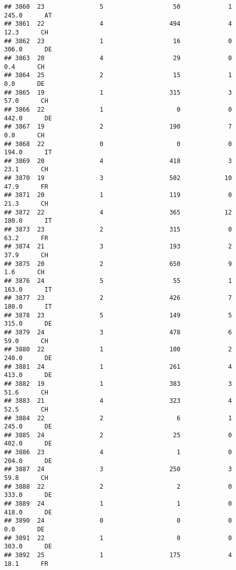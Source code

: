 \documentclass[
]{article}
\begin{document}
\begin{verbatim}
## 3860  23               5                   50             1    245.0      AT
## 3861  22               4                  494             4     12.3      CH
## 3862  23               1                   16             0    306.0      DE
## 3863  20               4                   29             0      0.4      CH
## 3864  25               2                   15             1      0.0      DE
## 3865  19               1                  315             3     57.0      CH
## 3866  22               1                    0             0    442.0      DE
## 3867  19               2                  190             7      0.0      CH
## 3868  22               0                    0             0    194.0      IT
## 3869  20               4                  418             3     23.1      CH
## 3870  19               3                  502            10     47.9      FR
## 3871  20               1                  119             0     21.3      CH
## 3872  22               4                  365            12    180.0      IT
## 3873  23               2                  315             0     63.2      FR
## 3874  21               3                  193             2     37.9      CH
## 3875  20               2                  650             9      1.6      CH
## 3876  24               5                   55             1    163.0      IT
## 3877  23               2                  426             7    180.0      IT
## 3878  23               5                  149             5    315.0      DE
## 3879  24               3                  478             6     59.0      CH
## 3880  22               1                  100             2    240.0      DE
## 3881  24               1                  261             4    413.0      DE
## 3882  19               1                  383             3     51.6      CH
## 3883  21               4                  323             4     52.5      CH
## 3884  22               2                    6             1    245.0      DE
## 3885  24               2                   25             0    402.0      DE
## 3886  23               4                    1             0    204.0      DE
## 3887  24               3                  250             3     59.8      CH
## 3888  22               2                    2             0    333.0      DE
## 3889  24               1                    1             0    418.0      DE
## 3890  24               0                    0             0      0.0      DE
## 3891  22               1                    0             0    303.0      DE
## 3892  25               1                  175             4     18.1      FR

\end{verbatim}
\end{document}

